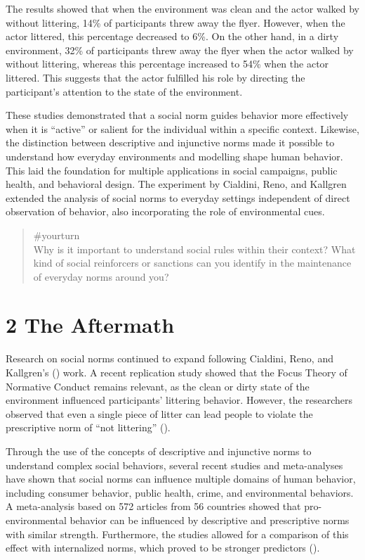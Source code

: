 \documentclass[
  letterpaper,
]{book}
\begin{document}
The results showed that when the environment was clean and the actor
walked by without littering, 14\% of participants threw away the flyer.
However, when the actor littered, this percentage decreased to 6\%. On
the other hand, in a dirty environment, 32\% of participants threw away
the flyer when the actor walked by without littering, whereas this
percentage increased to 54\% when the actor littered. This suggests that
the actor fulfilled his role by directing the participant's attention to
the state of the environment.

These studies demonstrated that a social norm guides behavior more
effectively when it is ``active'' or salient for the individual within a
specific context. Likewise, the distinction between descriptive and
injunctive norms made it possible to understand how everyday
environments and modelling shape human behavior. This laid the
foundation for multiple applications in social campaigns, public health,
and behavioral design. The experiment by Cialdini, Reno, and Kallgren
extended the analysis of social norms to everyday settings independent
of direct observation of behavior, also incorporating the role of
environmental cues.

\begin{quote}
{\#yourturn}\\
Why is it important to understand social rules within their context?
What kind of social reinforcers or sanctions can you identify in the
maintenance of everyday norms around you?
\end{quote}

\section{2 The Aftermath}\label{the-aftermath-14}

Research on social norms continued to expand following Cialdini, Reno,
and Kallgren's () work. A recent
replication study showed that the Focus Theory of Normative Conduct
remains relevant, as the clean or dirty state of the environment
influenced participants' littering behavior. However, the researchers
observed that even a single piece of litter can lead people to violate
the prescriptive norm of ``not littering''
().

Through the use of the concepts of descriptive and injunctive norms to
understand complex social behaviors, several recent studies and
meta-analyses have shown that social norms can influence multiple
domains of human behavior, including consumer behavior, public health,
crime, and environmental behaviors. A meta-analysis based on 572
articles from 56 countries showed that pro-environmental behavior can be
influenced by descriptive and prescriptive norms with similar strength.
Furthermore, the studies allowed for a comparison of this effect with
internalized norms, which proved to be stronger predictors
().
\end{document}
